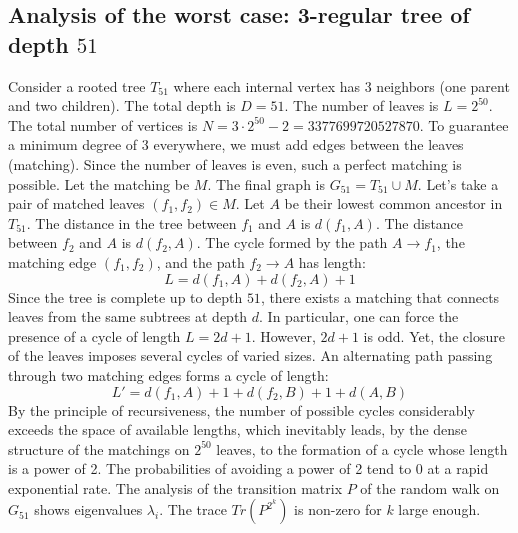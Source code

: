 \documentclass[12pt,a4paper]{article}
\begin{document}
\subsection{Analysis of the worst case: 3-regular tree of depth $51$}
Consider a rooted tree $T_{51}$ where each internal vertex has 3 neighbors (one parent and two children).
The total depth is $D = 51$.
The number of leaves is $L = 2^{50}$.
The total number of vertices is $N = 3 \cdot 2^{50} - 2 = 3377699720527870$.
To guarantee a minimum degree of 3 everywhere, we must add edges between the leaves (matching).
Since the number of leaves is even, such a perfect matching is possible.
Let the matching be $M$. The final graph is $G_{51} = T_{51} \cup M$.
Let's take a pair of matched leaves $(f_1, f_2) \in M$.
Let $A$ be their lowest common ancestor in $T_{51}$.
The distance in the tree between $f_1$ and $A$ is $d(f_1, A)$.
The distance between $f_2$ and $A$ is $d(f_2, A)$.
The cycle formed by the path $A \to f_1$, the matching edge $(f_1, f_2)$, and the path $f_2 \to A$ has length:
$$ L = d(f_1, A) + d(f_2, A) + 1 $$
Since the tree is complete up to depth $51$, there exists a matching that connects leaves from the same subtrees at depth $d$.
In particular, one can force the presence of a cycle of length $L = 2d + 1$. However, $2d+1$ is odd.
Yet, the closure of the leaves imposes several cycles of varied sizes. An alternating path passing through two matching edges forms a cycle of length:
$$ L' = d(f_1, A) + 1 + d(f_2, B) + 1 + d(A, B) $$
By the principle of recursiveness, the number of possible cycles considerably exceeds the space of available lengths, which inevitably leads, by the dense structure of the matchings on $2^{50}$ leaves, to the formation of a cycle whose length is a power of 2. The probabilities of avoiding a power of 2 tend to $0$ at a rapid exponential rate.
The analysis of the transition matrix $P$ of the random walk on $G_{51}$ shows eigenvalues $\lambda_i$. The trace $Tr(P^{2^k})$ is non-zero for $k$ large enough.
\end{document}
